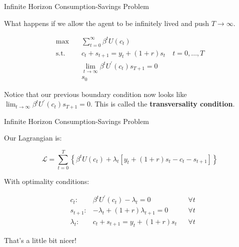 \documentclass[11pt, xcolor={dvipsnames}, hyperref={colorlinks, allcolors=Blue}]{beamer}
\newcommand\bc[1]{{\usebeamercolor[fg]{frametitle} {\textbf{#1}}}} %
\begin{document}
\begin{frame}{Infinite Horizon Consumption-Savings Problem}

What happens if we allow the agent to be infinitely lived and push $T \to \infty$.


\begin{align*}
\max \quad & \sum_{t=0}^{\infty} \beta^{t} U(c_{t})\\
\text{s.t.} \quad & c_{t} + s_{t+1} = y_{t} + (1+r)s_{t} \quad t = 0,\dots, T\\
& \lim_{t\to\infty} \beta^{t} U^{\prime}(c_{t}) s_{T+1} = 0\\
&s_{0}
\end{align*}

Notice that our previous boundary condition now looks like $\lim_{t\to\infty} \beta^{t} U^{\prime}(c_{t}) s_{T+1} = 0$. This is called the \bc{transversality condition}.
\end{frame}

\begin{frame}{Infinite Horizon Consumption-Savings Problem}

Our Lagrangian is:

\[\mathcal{L} = \sum_{t=0}^{T}\left \{ \beta^{t}U(c_{t}) + \lambda_{t}[y_{t} + (1+r)s_{t} - c_{t} - s_{t+1}] \right\}\]
\medskip

With optimality conditions:

\begin{align*}
&c_{t}:&      \beta^{t} U^{\prime}(c_{t}) - \lambda_{t} = 0  &  &\forall t\\
&s_{t+1}:&  -\lambda_{t} + (1+r)\lambda_{t+1} = 0         && \forall t\\
&\lambda_{t}:& c_{t} + s_{t+1} = y_{t} + (1+r)s_{t} && \forall t
\end{align*}
\medskip

That's a little bit nicer!
\end{frame}
\end{document}
